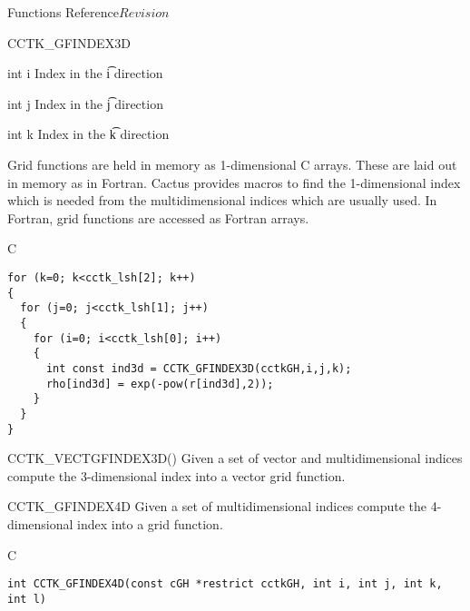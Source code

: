 \begin{cactuspart}{ Functions Reference}{}{$Revision$}
\begin{FunctionDescription}{CCTK\_GFINDEX3D}
\begin{ParameterSection}
\begin{Parameter} {int i}
Index in the \t{i} direction
\end{Parameter}

\begin{Parameter} {int j}
Index in the \t{j} direction
\end{Parameter}

\begin{Parameter} {int k}
Index in the \t{k} direction
\end{Parameter}
\end{ParameterSection}

\begin{Discussion}
Grid functions are held in memory as 1-dimensional C arrays. These are
laid out in memory as in Fortran. Cactus provides macros to find the
1-dimensional index which is needed from the multidimensional indices which
are usually used. In Fortran, grid functions are accessed as Fortran arrays.
\end{Discussion}
\begin{ExampleSection}
\begin{Example}{C}
\begin{verbatim}
for (k=0; k<cctk_lsh[2]; k++)
{
  for (j=0; j<cctk_lsh[1]; j++)
  {
    for (i=0; i<cctk_lsh[0]; i++)
    {
      int const ind3d = CCTK_GFINDEX3D(cctkGH,i,j,k);
      rho[ind3d] = exp(-pow(r[ind3d],2));
    }
  }
}
\end{verbatim}
\end{Example}
\end{ExampleSection}
\begin{SeeAlsoSection}
\begin{SeeAlso}{CCTK\_VECTGFINDEX3D()}
Given a set of vector and multidimensional indices compute the 3-dimensional
index into a vector grid function.
\end{SeeAlso}

\end{SeeAlsoSection}
\end{FunctionDescription}



\begin{FunctionDescription}{CCTK\_GFINDEX4D}
\label{CCTK-GFINDEX4D}
Given a set of multidimensional indices compute the 4-dimensional index into a
grid function.
\begin{SynopsisSection}
\begin{Synopsis}{C}
\begin{verbatim}
int CCTK_GFINDEX4D(const cGH *restrict cctkGH, int i, int j, int k, int l)
\end{verbatim}
\end{Synopsis}
\end{SynopsisSection}


\end{FunctionDescription}
\end{cactuspart}

